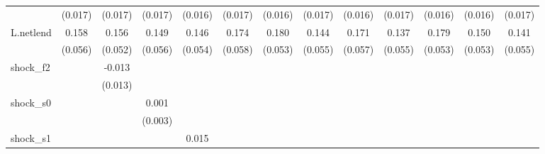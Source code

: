 {\begin{tabular}{l*{12}{c}}
            &     (0.017)         &     (0.017)         &     (0.017)         &     (0.016)         &     (0.017)         &     (0.016)         &     (0.017)         &     (0.016)         &     (0.017)         &     (0.016)         &     (0.016)         &     (0.017)         \\
\addlinespace
L.netlend   &       0.158\sym{**} &       0.156\sym{***}&       0.149\sym{**} &       0.146\sym{**} &       0.174\sym{***}&       0.180\sym{***}&       0.144\sym{**} &       0.171\sym{***}&       0.137\sym{**} &       0.179\sym{***}&       0.150\sym{**} &       0.141\sym{**} \\
            &     (0.056)         &     (0.052)         &     (0.056)         &     (0.054)         &     (0.058)         &     (0.053)         &     (0.055)         &     (0.057)         &     (0.055)         &     (0.053)         &     (0.053)         &     (0.055)         \\
\addlinespace
shock\_f2    &                     &      -0.013         &                     &                     &                     &                     &                     &                     &                     &                     &                     &                     \\
            &                     &     (0.013)         &                     &                     &                     &                     &                     &                     &                     &                     &                     &                     \\
\addlinespace
shock\_s0    &                     &                     &       0.001         &                     &                     &                     &                     &                     &                     &                     &                     &                     \\
            &                     &                     &     (0.003)         &                     &                     &                     &                     &                     &                     &                     &                     &                     \\
\addlinespace
shock\_s1    &                     &                     &                     &       0.015\sym{*}  &                     &                     &                     &                     &                     &                     &                     &                     \\

\end{tabular}}
